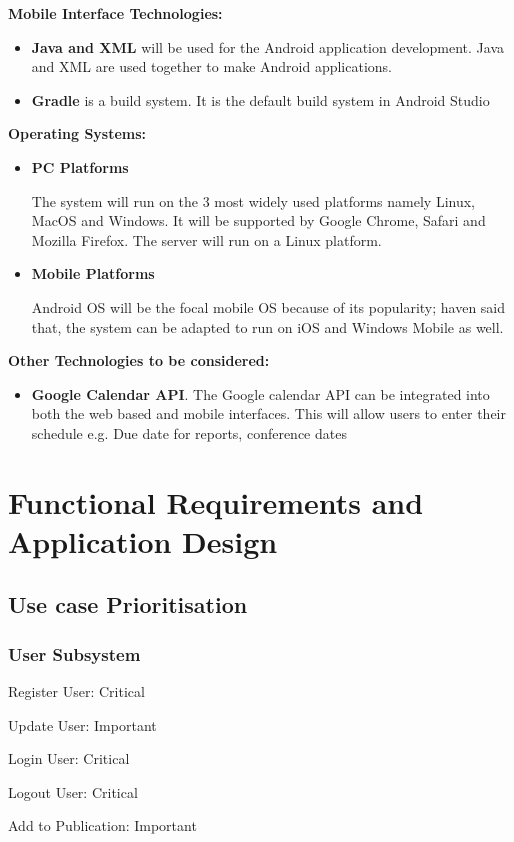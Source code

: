 \documentclass{article}
\begin{document}
\textbf{Mobile Interface Technologies:}\par
\begin{itemize}
\item \textbf{Java and XML} will be used for the Android application development. Java and XML are used together to make Android applications.
\item \textbf{Gradle} is a build system. It is the default build system in Android Studio
\end{itemize}
\textbf{Operating Systems:}\par
\begin{itemize}
\item \textbf{PC Platforms} \par
The system will run on the 3 most widely used platforms namely Linux, MacOS and Windows. It will be supported by Google Chrome, Safari and Mozilla Firefox. The server will run on a Linux platform.
\item \textbf{Mobile Platforms} \par
Android OS will be the focal mobile OS because of its popularity; haven said that, the system can be adapted to run on iOS and Windows Mobile as well.
\end{itemize}
\textbf{Other Technologies to be considered:}\par
\begin{itemize}
\item \textbf{Google Calendar API}. The Google calendar API can be integrated into both the web based and mobile interfaces. This will allow users to enter their schedule e.g. Due date for reports, conference dates
\end{itemize}


		
	
	\section{Functional Requirements and Application Design}
		\subsection{Use case Prioritisation}
			\subsubsection{User Subsystem}
				Register User: Critical\par
				Update User: Important\par
				Login User: Critical\par
				Logout User: Critical\par
				Add to Publication: Important
\end{document}
